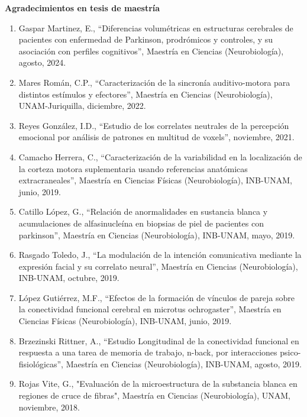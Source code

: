 {\large \textbf{\color{red}Agradecimientos en tesis de maestría}}

\begin{enumerate}
\item Gaspar Martinez, E., “Diferencias volumétricas en estructuras cerebrales de pacientes con 
enfermedad de Parkinson, prodrómicos y controles, y su asociación con perfiles cognitivos”, Maestría 
en Ciencias (Neurobiología), agosto, 2024.

\item Mares Román, C.P., “Caracterización de la sincronía auditivo-motora para distintos estímulos y efectores”, Maestría en Ciencias (Neurobiología), 
UNAM-Juriquilla, diciembre, 2022.

\item Reyes González, I.D., “Estudio de los correlates neutrales de la percepción emocional por análisis de patrones en multitud de voxels”, noviembre, 2021.

\item Camacho Herrera, C., “Caracterización de la variabilidad en la localización de la corteza motora suplementaria usando referencias anatómicas 
extracraneales”, Maestría en Ciencias Físicas (Neurobiología), INB-UNAM, junio, 2019.

\item Catillo López, G., “Relación de anormalidades en sustancia blanca y acumulaciones de alfasinucleína en biopsias de piel de pacientes con parkinson”, 
Maestría en Ciencias (Neurobiología), INB-UNAM, mayo, 2019.

\item Rasgado Toledo, J., “La modulación de la intención comunicativa mediante la expresión facial y su correlato neural”, Maestría en Ciencias 
(Neurobiología), INB-UNAM, octubre, 2019.

\item López Gutiérrez, M.F., “Efectos de la formación de vínculos de pareja sobre la conectividad funcional cerebral en microtus ochrogaster”, Maestría en 
Ciencias Físicas (Neurobiología), INB-UNAM, junio, 2019.

\item Brzezinski Rittner, A., “Estudio Longitudinal de la conectividad funcional en respuesta a una tarea de memoria de trabajo, n-back, por interacciones 
psico-fisiológicas”, Maestría en Ciencias (Neurobiología), INB-UNAM, agosto, 2019.

\item Rojas Vite, G., "Evaluación de la microestructura de la substancia blanca en regiones de cruce de fibras", Maestría en Ciencias (Neurobiología), UNAM,   
noviembre, 2018.


\end{enumerate}

